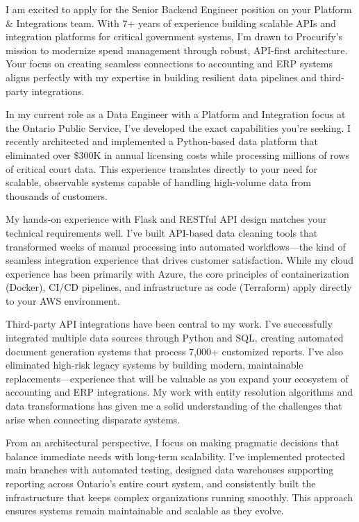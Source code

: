 \storeletterdate{\today}

\begin{storedcvletter}{
I am excited to apply for the Senior Backend Engineer position on your Platform \& Integrations team. With 7+ years of experience building scalable APIs and integration platforms for critical government systems, I'm drawn to Procurify's mission to modernize spend management through robust, API-first architecture. Your focus on creating seamless connections to accounting and ERP systems aligns perfectly with my expertise in building resilient data pipelines and third-party integrations.

In my current role as a Data Engineer with a Platform and Integration focus at the Ontario Public Service, I've developed the exact capabilities you're seeking. I recently architected and implemented a Python-based data platform that eliminated over \$300K in annual licensing costs while processing millions of rows of critical court data. This experience translates directly to your need for scalable, observable systems capable of handling high-volume data from thousands of customers.

My hands-on experience with Flask and RESTful API design matches your technical requirements well. I've built API-based data cleaning tools that transformed weeks of manual processing into automated workflows—the kind of seamless integration experience that drives customer satisfaction. While my cloud experience has been primarily with Azure, the core principles of containerization (Docker), CI/CD pipelines, and infrastructure as code (Terraform) apply directly to your AWS environment.

Third-party API integrations have been central to my work. I've successfully integrated multiple data sources through Python and SQL, creating automated document generation systems that process 7,000+ customized reports. I've also eliminated high-risk legacy systems by building modern, maintainable replacements—experience that will be valuable as you expand your ecosystem of accounting and ERP integrations. My work with entity resolution algorithms and data transformations has given me a solid understanding of the challenges that arise when connecting disparate systems.

From an architectural perspective, I focus on making pragmatic decisions that balance immediate needs with long-term scalability. I've implemented protected main branches with automated testing, designed data warehouses supporting reporting across Ontario's entire court system, and consistently built the infrastructure that keeps complex organizations running smoothly. This approach ensures systems remain maintainable and scalable as they evolve.

}
\end{storedcvletter}
